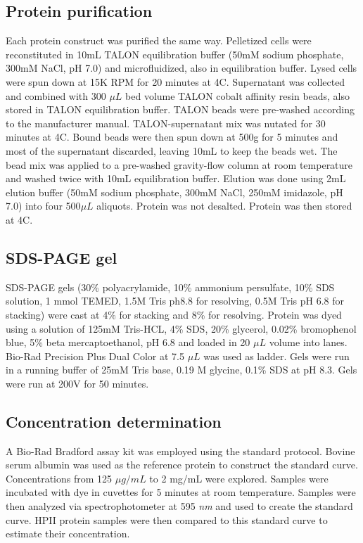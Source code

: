 \documentclass[9pt,twocolumn,twoside]{pnas-new}
\begin{document}
{\subsection*{Protein purification}
Each protein construct was purified the same way. Pelletized cells were reconstituted in 10mL TALON equilibration buffer (50mM sodium phosphate, 300mM NaCl, pH 7.0) and microfluidized, also in equilibration buffer. Lysed cells were spun down at 15K RPM for 20 minutes at 4\degree C. Supernatant was collected and combined with 300 $\mu L$ bed volume TALON cobalt affinity resin beads, also stored in TALON equilibration buffer. TALON beads were pre-washed according to the manufacturer manual. TALON-supernatant mix was nutated for 30 minutes at 4\degree C. Bound beads were then spun down at 500g for 5 minutes and most of the supernatant discarded, leaving 10mL to keep the beads wet. The bead mix was applied to a pre-washed gravity-flow column at room temperature and washed twice with 10mL equilibration buffer. Elution was done using 2mL elution buffer (50mM sodium phosphate, 300mM NaCl, 250mM imidazole, pH 7.0) into four 500$\mu L$ aliquots. Protein was not desalted. Protein was then stored at 4\degree C.\\

\subsection*{SDS-PAGE gel}
SDS-PAGE gels (30\% polyacrylamide, 10\% ammonium persulfate, 10\% SDS solution, 1 mmol TEMED, 1.5M Tris ph8.8 for resolving, 0.5M Tris pH 6.8 for stacking) were cast at 4\% for stacking and 8\% for resolving. Protein was dyed using a solution of 125mM Tris-HCL, 4\% SDS, 20\% glycerol, 0.02\% bromophenol blue, 5\% beta mercaptoethanol, pH 6.8 and loaded in 20 $\mu L$ volume into lanes. Bio-Rad Precision Plus Dual Color at 7.5 $\mu L$ was used as ladder. Gels were run in a running buffer of 25mM Tris base, 0.19 M glycine, 0.1\% SDS at pH 8.3. Gels were run at 200V for 50 minutes.\\

\subsection*{Concentration determination}
A Bio-Rad Bradford assay kit was employed using the standard protocol. Bovine serum albumin was used as the reference protein to construct the standard curve. Concentrations from 125 $\mu g / mL$ to 2 mg/mL were explored. Samples were incubated with dye in cuvettes for 5 minutes at room temperature. Samples were then analyzed via spectrophotometer at 595 \textit{nm} and used to create the standard curve. HPII protein samples were then compared to this standard curve to estimate their concentration.\\

}
\end{document}
